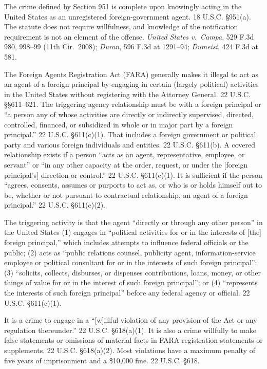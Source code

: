 The crime defined by Section 951 is complete upon knowingly acting in the United States as an unregistered foreign-government agent.
18 U.S.C. \S 951(a).
The statute does not require willfulness, and knowledge of the notification requirement is not an element of the offense.
\textit{United States v.\ Campa}, 529 F.3d 980, 998--99 (11th Cir.~2008); \textit{Duran}, 596 F.3d at 1291--94; \textit{Dumeisi}, 424 F.3d at 581.

The Foreign Agents Registration Act (FARA) generally makes it illegal to act as an agent of a foreign principal by engaging in certain (largely political) activities in the United States without registering with the Attorney General. 22 U.S.C. \S\S 611--621. The triggering agency relationship must be with a foreign principal or ``a person any of whose activities are directly or indirectly supervised, directed, controlled, financed, or subsidized in whole or in major part by a foreign principal.'' 22 U.S.C. \S 611(c)(1).
That includes a foreign government or political party and various foreign individuals and entities.
22 U.S.C. \S 611(b).
A covered relationship exists if a person ``acts as an agent, representative, employee, or servant'' or ``in any other capacity at the order, request, or under the [foreign principal's] direction or control.''
22 U.S.C. \S 611(c)(1).
It is sufficient if the person ``agrees, consents, assumes or purports to act as, or who is or holds himself out to be, whether or not pursuant to contractual relationship, an agent of a foreign principal.''
22 U.S.C. \S 611(c)(2).

The triggering activity is that the agent ``directly or through any other person'' in the United States (1) engages in ``political activities for or in the interests of [the] foreign principal,'' which includes attempts to influence federal officials or the public; (2) acts as ``public relations counsel, publicity agent, information-service employee or political consultant for or in the interests of such foreign principal''; (3) ``solicits, collects, disburses, or dispenses contributions, loans, money, or other things of value for or in the interest of such foreign principal''; or (4) ``represents the interests of such foreign principal'' before any federal agency or official.
22 U.S.C. \S 611(c)(1).

It is a crime to engage in a ``[w]illful violation of any provision of the Act or any regulation thereunder.''
22 U.S.C. \S 618(a)(1).
It is also a crime willfully to make false statements or omissions of material facts in FARA registration statements or supplements.
22 U.S.C. \S 618(a)(2).
Most violations have a maximum penalty of five years of imprisonment and a \$10,000 fine.
22 U.S.C. \S 618.


